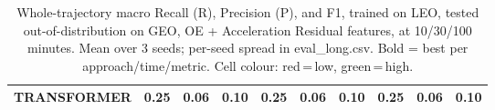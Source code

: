 \begin{table}[t]
{\begin{tabular}{l ccc ccc ccc}
\textbf{TRANSFORMER} & \cellcolor[HTML]{FF6B6B}0.25 & \cellcolor[HTML]{FF6B6B}0.06 & \cellcolor[HTML]{FF6B6B}0.10 & \cellcolor[HTML]{FF6B6B}0.25 & \cellcolor[HTML]{FF6B6B}0.06 & \cellcolor[HTML]{FF6B6B}0.10 & \cellcolor[HTML]{FF6B6B}0.25 & \cellcolor[HTML]{FF6B6B}0.06 & \cellcolor[HTML]{FF6B6B}0.10 \\
\bottomrule
\end{tabular}%
}
\caption{Whole-trajectory macro Recall (R), Precision (P), and F1, trained on LEO, tested out-of-distribution on GEO, OE + Acceleration Residual features, at 10/30/100 minutes. Mean over 3 seeds; per-seed spread in eval\_long.csv. Bold = best per approach/time/metric. Cell colour: red\,=\,low, green\,=\,high.}
\label{tab:total_leo_to_geo_ladder}
\end{table}
